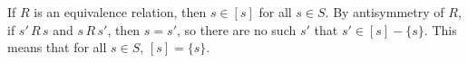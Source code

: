If $R$ is an equivalence relation, then $s\in[s]$ for all $s\in S$.
By antisymmetry of $R$, if $s'\,R\,s$ and $s\,R\,s'$, then $s=s'$, so there are no such $s'$ that $s'\in[s]-\{s\}$.
This means that for all $s\in S$, $[s]=\{s\}$.
